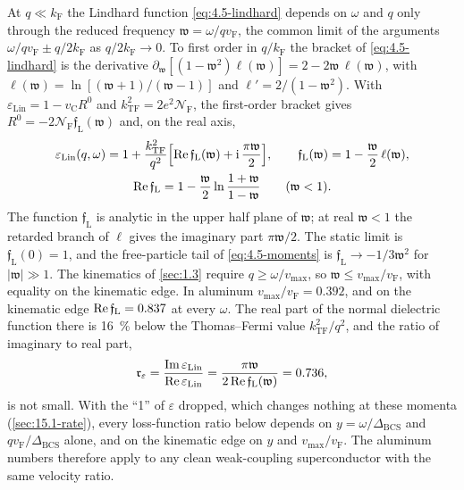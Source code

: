 At $q \ll k_{\mathrm{F}}$ the Lindhard function \cref{eq:4.5-lindhard} depends on $\omega$ and $q$ only through the reduced frequency $\mathfrak{w} = \omega/qv_{\mathrm{F}}$, the common limit of the arguments $\omega/qv_{\mathrm{F}} \pm q/2k_{\mathrm{F}}$ as $q/2k_{\mathrm{F}} \to 0$. To first order in $q/k_{\mathrm{F}}$ the bracket of \cref{eq:4.5-lindhard} is the derivative $\partial_{\mathfrak{w}}[(1 - \mathfrak{w}^2)\ell(\mathfrak{w})] = 2 - 2\mathfrak{w}\,\ell(\mathfrak{w})$, with $\ell(\mathfrak{w}) = \ln[(\mathfrak{w} + 1)/(\mathfrak{w} - 1)]$ and $\ell' = 2/(1 - \mathfrak{w}^2)$. With $\varepsilon_{\mathrm{Lin}} = 1 - v_{\mathrm{C}}R^0$ and $k_{\mathrm{TF}}^2 = 2e^2\mathcal{N}_{\mathrm{F}}$, the first-order bracket gives $R^0 = -2\mathcal{N}_{\mathrm{F}}\mathfrak{f}_{\mathrm{L}}(\mathfrak{w})$ and, on the real axis,
\begin{equation}
  \begin{gathered}
  \varepsilon_{\mathrm{Lin}}(q,\omega) = 1 + \frac{k_{\mathrm{TF}}^2}{q^2}\Bigl[\operatorname{Re}\mathfrak{f}_{\mathrm{L}}(\mathfrak{w}) + \mathrm{i}\,\frac{\pi\mathfrak{w}}{2}\Bigr] , \qquad
  \mathfrak{f}_{\mathrm{L}}(\mathfrak{w}) = 1 - \frac{\mathfrak{w}}{2}\,\ell(\mathfrak{w}) , \\
  \operatorname{Re}\mathfrak{f}_{\mathrm{L}} = 1 - \frac{\mathfrak{w}}{2}\ln\frac{1 + \mathfrak{w}}{1 - \mathfrak{w}} \qquad (\mathfrak{w} < 1) .
  \end{gathered}
  \label{eq:15.2-Lin}
\end{equation}
The function $\mathfrak{f}_{\mathrm{L}}$ is analytic in the upper half plane of $\mathfrak{w}$; at real $\mathfrak{w} < 1$ the retarded branch of $\ell$ gives the imaginary part $\pi\mathfrak{w}/2$. The static limit is $\mathfrak{f}_{\mathrm{L}}(0) = 1$, and the free-particle tail of \cref{eq:4.5-moments} is $\mathfrak{f}_{\mathrm{L}} \to -1/3\mathfrak{w}^2$ for $|\mathfrak{w}| \gg 1$. The kinematics of \cref{sec:1.3} require $q \ge \omega/v_{\mathrm{max}}$, so $\mathfrak{w} \le v_{\mathrm{max}}/v_{\mathrm{F}}$, with equality on the kinematic edge. In aluminum $v_{\mathrm{max}}/v_{\mathrm{F}} = 0.392$, and on the kinematic edge $\operatorname{Re}\mathfrak{f}_{\mathrm{L}} = 0.837$ at every $\omega$. The real part of the normal dielectric function there is \SI{16}{\percent} below the Thomas--Fermi value $k_{\mathrm{TF}}^2/q^2$, and the ratio of imaginary to real part,
\begin{equation*}
  \mathfrak{r}_\varepsilon = \frac{\operatorname{Im}\varepsilon_{\mathrm{Lin}}}{\operatorname{Re}\varepsilon_{\mathrm{Lin}}} = \frac{\pi\mathfrak{w}}{2\operatorname{Re}\mathfrak{f}_{\mathrm{L}}(\mathfrak{w})} = 0.736 ,
\end{equation*}
is not small. With the ``1'' of $\varepsilon$ dropped, which changes nothing at these momenta (\cref{sec:15.1-rate}), every loss-function ratio below depends on $y = \omega/\Delta_{\mathrm{BCS}}$ and $qv_{\mathrm{F}}/\Delta_{\mathrm{BCS}}$ alone, and on the kinematic edge on $y$ and $v_{\mathrm{max}}/v_{\mathrm{F}}$. The aluminum numbers therefore apply to any clean weak-coupling superconductor with the same velocity ratio.

